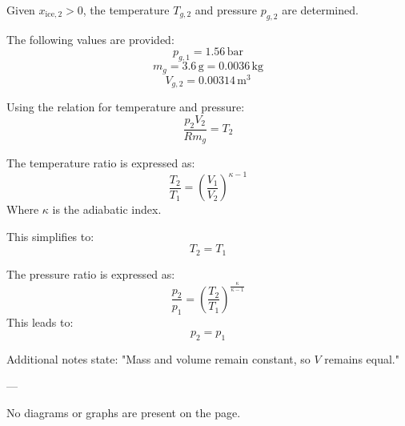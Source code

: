 Given \( x_{\text{ice},2} > 0 \), the temperature \( T_{g,2} \) and pressure \( p_{g,2} \) are determined.  

The following values are provided:  
\[
p_{g,1} = 1.56 \, \text{bar}
\]
\[
m_g = 3.6 \, \text{g} = 0.0036 \, \text{kg}
\]
\[
V_{g,2} = 0.00314 \, \text{m}^3
\]

Using the relation for temperature and pressure:  
\[
\frac{p_2 V_2}{R m_g} = T_2
\]

The temperature ratio is expressed as:  
\[
\frac{T_2}{T_1} = \left( \frac{V_1}{V_2} \right)^{\kappa - 1}
\]
Where \( \kappa \) is the adiabatic index.  

This simplifies to:  
\[
T_2 = T_1
\]

The pressure ratio is expressed as:  
\[
\frac{p_2}{p_1} = \left( \frac{T_2}{T_1} \right)^{\frac{\kappa}{\kappa - 1}}
\]
This leads to:  
\[
p_2 = p_1
\]

Additional notes state:  
"Mass and volume remain constant, so \( V \) remains equal."

---

No diagrams or graphs are present on the page.